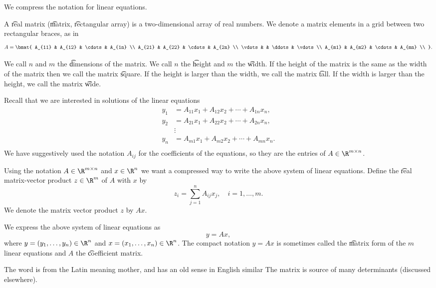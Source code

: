 
We compress the notation for linear equations.

A \t{real matrix} (\t{matrix}, \t{rectangular array}) is a two-dimensional array of real numbers.
We denote a matrix elements in a grid between two rectangular braces, as in
  \[
A = \bmat{
A_{11} & A_{12} & \cdots & A_{1n} \\
A_{21} & A_{22} & \cdots & A_{2n} \\
\vdots & & \ddots & \vdots \\
A_{m1} & A_{m2} & \cdots & A_{mn} \\
}.
  \]

We call $n$ and $m$ the \t{dimensions} of the matrix.
We call $n$ the \t{height} and $m$ the \t{width}.
If the height of the matrix is the same as the width of the matrix then we call the matrix \t{square}.
If the height is larger than the width, we call the matrix \t{tall}.
If the width is larger than the height, we call the matrix \t{wide}.

Recall that we are interested in solutions of the linear equations
  \[
\begin{aligned}
y_1 &= A_{11}x_1 + A_{12}x_2 + \cdots + A_{1n}x_n, \\
y_2 &= A_{21}x_1 + A_{22}x_2 + \cdots + A_{2n}x_n, \\
&\vdots \\
y_n &= A_{m1}x_1 + A_{m2}x_2 + \cdots + A_{mn}x_n. \\
\end{aligned}
  \]
We have suggestively used the notation $A_{ij}$ for the coefficients of the equations, so they are the entries of $A \in \R^{m \times n}$.

Using the notation $A \in \R^{m \times n}$ and $x \in \R^n$ we want a compressed way to write the above system of linear equations.
Define the \t{real matrix-vector product} $z \in \R^m$ of $A$ with $x$ by
  \[
z_{i} = \sum_{j = 1}^{n} A_{ij}x_j, \quad i = 1, \dots, m.
  \]
We denote the matrix vector product $z$ by $Ax$.

We express the above system of linear equations as
  \[
y = Ax,
  \]
where $y = (y_1, \dots, y_n) \in \R^{n}$ and $x = (x_1, \dots, x_n) \in \R^n$.
The compact notation $y = Ax$ is sometimes called the \t{matrix form} of the $m$ linear equations and $A$ the \t{coefficient matrix}.

The word  is from the Latin  meaning mother, and has an old sense in English similar 
The matrix is source of many determinants (discussed elsewhere).
